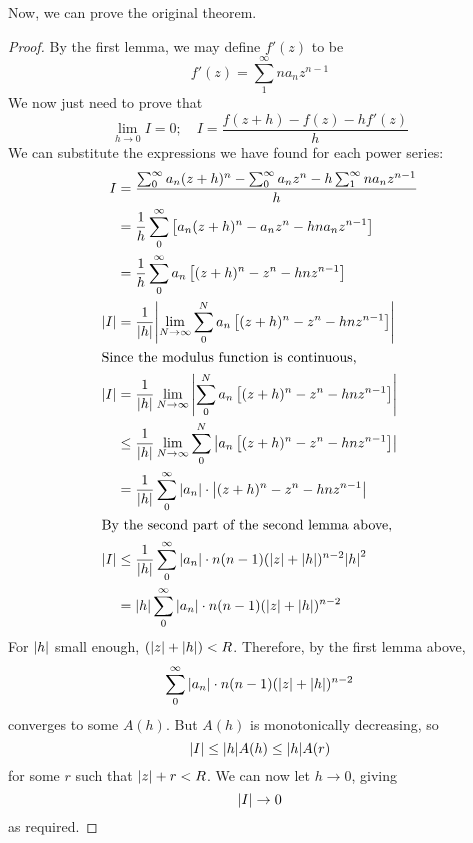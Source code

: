 \documentclass{article}
\begin{document}
\noindent Now, we can prove the original theorem.
\begin{proof}
    By the first lemma, we may define $f'(z)$ to be
    \[ f'(z) = \sum_1^\infty n a_n z^{n-1} \]
    We now just need to prove that
    \[ \lim_{h \to 0} I = 0;\quad I = \frac{f(z + h) - f(z) - h f'(z)}{h} \]
    We can substitute the expressions we have found for each power series:
    \begin{align*}
        I       & = \frac{\sum_0^\infty a_n (z+h)^n - \sum_0^\infty a_n z^n - h \sum_1^\infty n a_n z^{n-1}}{h}            \\
                & = \frac{1}{h} \sum_0^\infty \left[ a_n (z+h)^n - a_n z^n - h n a_n z^{n-1} \right]                       \\
                & = \frac{1}{h} \sum_0^\infty a_n \left[ (z+h)^n - z^n - h n z^{n-1} \right]                               \\
        \abs{I} & = \frac{1}{\abs{h}} \abs{\lim_{N \to \infty} \sum_0^N a_n \left[ (z+h)^n - z^n - h n z^{n-1} \right]}    \\
        \intertext{Since the modulus function is continuous,}
        \abs{I} & = \frac{1}{\abs{h}} \lim_{N \to \infty} \abs{\sum_0^N a_n \left[ (z+h)^n - z^n - h n z^{n-1} \right]}    \\
                & \leq \frac{1}{\abs{h}} \lim_{N \to \infty} \sum_0^N \abs{a_n \left[ (z+h)^n - z^n - h n z^{n-1} \right]} \\
                & = \frac{1}{\abs{h}} \sum_0^\infty \abs{a_n} \cdot \abs{(z+h)^n - z^n - h n z^{n-1}}                      \\
        \intertext{By the second part of the second lemma above,}
        \abs{I} & \leq \frac{1}{\abs{h}} \sum_0^\infty \abs{a_n} \cdot n(n-1)(\abs{z} + \abs{h})^{n-2}\abs{h}^2            \\
                & = \abs{h} \sum_0^\infty \abs{a_n} \cdot n(n-1)(\abs{z} + \abs{h})^{n-2}                                  \\
    \end{align*}
    For $\abs{h}$ small enough, $(\abs{z} + \abs{h}) < R$. Therefore, by the first lemma above,
    \[ \sum_0^\infty \abs{a_n} \cdot n(n-1)(\abs{z} + \abs{h})^{n-2} \]
    converges to some $A(h)$. But $A(h)$ is monotonically decreasing, so
    \[ \abs{I} \leq \abs{h} A(h) \leq \abs{h} A(r) \]
    for some $r$ such that $\abs{z} + r < R$. We can now let $h \to 0$, giving
    \[ \abs{I} \to 0 \]
    as required.
\end{proof}
\end{document}
